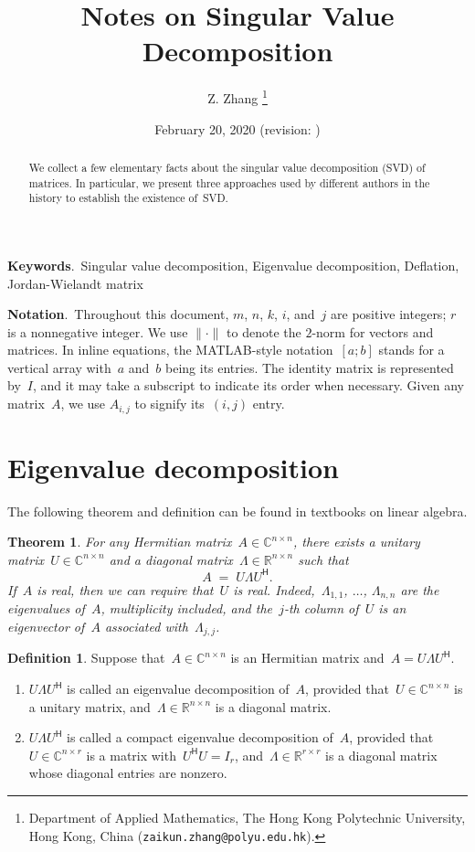 \documentclass[11pt,a4paper]{article}  %
\title{Notes on Singular Value Decomposition}
\date{February 20, 2020 (revision: \DTMnow)}
\author{
Z. Zhang
\thanks{
Department of Applied Mathematics, The Hong Kong Polytechnic University,
Hong Kong, China ({\tt zaikun.zhang@polyu.edu.hk}).
}
}
\numberwithin{equation}{section}
\newtheorem{theorem}{Theorem}%
\theoremstyle{definition}
\newtheorem{definition}{Definition}%
\def\RR{\mathbb{R}}
\def\CC{\mathbb{C}}
\newcommand{\hmt}{{\scriptscriptstyle{{\mathsf{H}}}}}
\begin{document}
\maketitle

\begin{abstract}
  We collect a few elementary facts about the singular value decomposition (SVD) of matrices. In
  particular, we present three approaches used by different authors in the history
  to establish the existence of~SVD.
\end{abstract}

\textbf{Keywords}.~Singular value decomposition, Eigenvalue decomposition, Deflation,
Jordan-Wielandt matrix

\textbf{Notation}.~Throughout this document, $m$, $n$, $k$, $i$, and~$j$ are positive integers; $r$ is a nonnegative integer.
We use $\|\cdot\|$ to denote the $2$-norm for vectors and matrices.
In inline equations, the MATLAB-style notation~$[a; b]$ stands for a vertical array
with~$a$ and~$b$ being its entries. The identity matrix is represented by~$I$, and it may take
a subscript to indicate its order when necessary. Given any matrix~$A$, we use $A_{i,j}$ to signify
its~$(i,j)$ entry.

\section{Eigenvalue decomposition}

The following theorem and definition can be found in textbooks on linear algebra.
\begin{theorem}
  \label{th:evd}
  For any Hermitian matrix~$A\in \CC^{n\times n}$, there exists a unitary matrix~$U\in
  \CC^{n\times n}$ and a diagonal matrix~$\Lambda \in \RR^{n\times n}$ such that
  \begin{equation*}
    A \; = \; U\Lambda U^\hmt.
  \end{equation*}
  If~$A$ is real, then we can require that~$U$ is real.
  Indeed,~$\Lambda_{1,1}$, $\dots$, $\Lambda_{n,n}$ are the eigenvalues of~$A$, multiplicity
  included, and the~$j$-th column of~$U$ is an eigenvector of~$A$ associated with~$\Lambda_{j,j}$.
\end{theorem}

\begin{definition}
  \label{def:evd}
  Suppose that~$A\in \CC^{n\times n}$ is an Hermitian matrix and~$A = U\Lambda U^\hmt$.
  \begin{enumerate}[leftmargin=1.5em]
    \item
      $U\Lambda U^\hmt$ is called an eigenvalue decomposition of~$A$, provided that~$U
      \in \CC^{n\times n}$ is a unitary matrix, and~$\Lambda \in \RR^{n\times n}$ is a diagonal
      matrix.
    \item
      $U\Lambda U^\hmt$ is called a compact eigenvalue decomposition of~$A$,
      provided that~$U \in \CC^{n\times r}$ is a matrix with~$U^\hmt U = I_r$,
      and~$\Lambda \in \RR^{r\times r}$ is a diagonal matrix whose diagonal entries are nonzero.
  \end{enumerate}
\end{definition}
\end{document}
